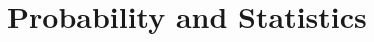 \documentclass[../main.tex]{subfiles}
\begin{document}
\chapter{Probability and Statistics}
\end{document}
